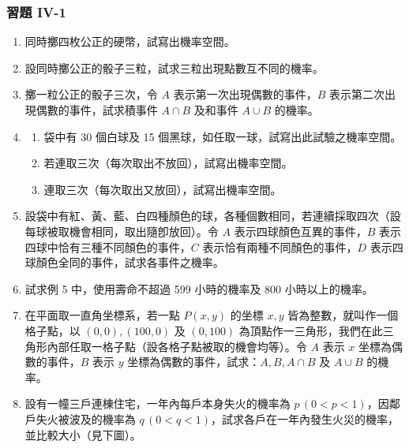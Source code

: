 \subsubsection*{習題 IV-1}\label{sec:b5-ex4-1}

\begin{enumerate}[label=\textbf{\arabic*.}]
  \item 同時擲四枚公正的硬幣，試寫出機率空間。
  \item 設同時擲公正的骰子三粒，試求三粒出現點數互不同的機率。
  \item 擲一粒公正的骰子三次，令 $A$ 表示第一次出現偶數的事件，$B$ 表示第二次出現偶數的事件，試求積事件 $A \cap B$ 及和事件 $A \cup B$ 的機率。
  \item 
  \begin{enumerate}[label=(\arabic*)]
    \item 袋中有 30 個白球及 15 個黑球，如任取一球，試寫出此試驗之機率空間。
    \item 若連取三次（每次取出不放回），試寫出機率空間。
    \item 連取三次（每次取出又放回），試寫出機率空間。
  \end{enumerate}
  \item 設袋中有紅、黃、藍、白四種顏色的球，各種個數相同，若連續採取四次（設每球被取機會相同，取出隨卽放回）。令 $A$ 表示四球顏色互異的事件，$B$ 表示四球中恰有三種不同顏色的事件，$C$ 表示恰有兩種不同顏色的事件，$D$ 表示四球顏色全同的事件，試求各事件之機率。
  \item 試求例 5 中，使用壽命不超過 599 小時的機率及 800 小時以上的機率。
  \item 在平面取一直角坐標系，若一點 $P(x, y)$ 的坐標 $x, y$ 皆為整數，就叫作一個格子點，以 $(0, 0), (100, 0)$ 及 $(0, 100)$ 為頂點作一三角形，我們在此三角形內部任取一格子點（設各格子點被取的機會均等）。令 $A$ 表示 $x$ 坐標為偶數的事件，$B$ 表示 $y$ 坐標為偶數的事件，試求：$A, B, A \cap B$ 及 $A \cup B$ 的機率。
  \item[\textbf{** 9.}\footnotemark] 設有一幢三戶連棟住宅，一年內每戶本身失火的機率為 $p\,(0 < p < 1)$，因鄰戶失火被波及的機率為 $q\,(0 < q < 1)$，試求各戶在一年內發生火災的機率，並比較大小（見下圖）。
  \label{note:b5-ch4-p123-q8}

  \begin{center}
\end{center}
\end{enumerate}
